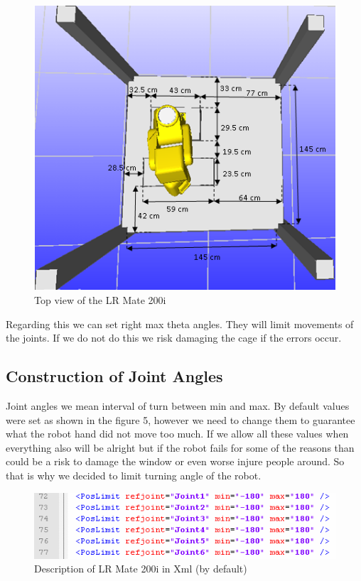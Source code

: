 \begin{figure}[H]
  \centering
  \includegraphics[scale= 0.7]{source/robworkCageDimensions.png}
  \caption{Top view of the LR Mate 200i}
  \label{fig:robworkCageDimensions}
\end{figure}

Regarding this we can set right max theta angles. They will limit movements of the joints. If we do not do this we risk damaging the cage if the errors occur.

\subsection{Construction of Joint Angles}
Joint angles we mean interval of turn between min and max. By default values were set as shown in the figure 5, however we need to change them to guarantee what the robot hand did not move too much. If we allow all these values when everything also will be alright but if the robot fails for some of the reasons than could be a risk to damage the window or even worse injure people around. So that is why we decided to limit turning angle of the robot. 

\begin{figure}[H]
  \centering
  \includegraphics[scale= 0.8]{source/angleDefaultXML.png}
  \caption{Description of LR Mate 200i in Xml (by default)}
  \label{fig:angleDefaultXML}
\end{figure}

